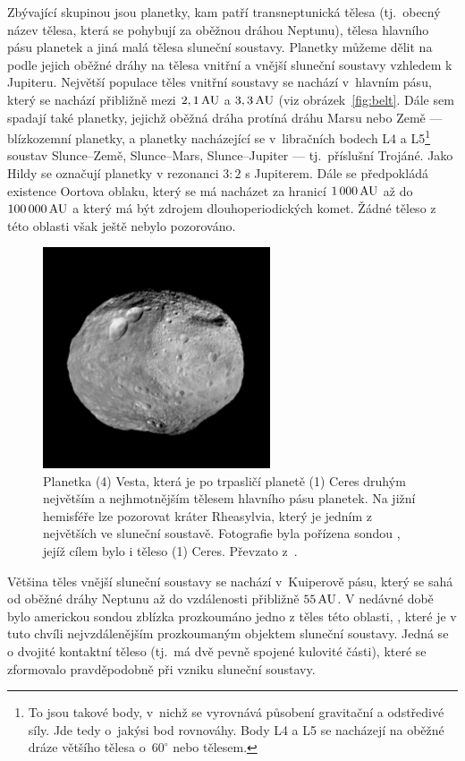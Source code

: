 \documentclass[A4paper, 12pt, oneside]{book}
\begin{document}
Zbývající skupinou jsou planetky, kam patří transneptunická tělesa (tj.\ obecný název tělesa, která se pohybují za oběžnou dráhou Neptunu), tělesa hlavního pásu planetek a jiná malá tělesa sluneční soustavy. Planetky můžeme dělit na podle jejich oběžné dráhy na tělesa vnitřní a vnější sluneční soustavy vzhledem k Jupiteru. Největší populace těles vnitřní soustavy se nachází v~hlavním pásu, který se nachází přibližně mezi $2,1\, {\rm AU}$ a $3,3\, {\rm AU}$ (viz obrázek~\ref{fig:belt}. Dále sem spadají také planetky, jejichž oběžná dráha protíná dráhu Marsu nebo Země --- blízkozemní planetky, a planetky nacházející se v~libračních bodech L4 a L5\footnote{To jsou takové body, v~nichž se vyrovnává působení gravitační a odstředivé síly. Jde tedy o~jakýsi bod rovnováhy. Body L4 a L5 se nacházejí na oběžné dráze většího tělesa o~$60^\circ$  nebo  tělesem.} soustav Slunce--Země, Slunce--Mars, Slunce--Jupiter --- tj.\ příslušní Trojáné. Jako Hildy se označují planetky v rezonanci $3:2$ s Jupiterem. Dále se předpokládá existence Oortova oblaku, který se má nacházet za hranicí $1\,000\,{\rm AU}$ až do $100\,000\,{\rm AU}$ a který má být zdrojem dlouhoperiodických komet. Žádné těleso z této oblasti však ještě nebylo pozorováno.

\begin{figure}
	\centering
	\includegraphics[width=0.6\textwidth]{obr/vesta.jpg}
	\caption{Planetka (4) Vesta, která je po trpasličí planetě (1) Ceres druhým největším a nejhmotnějším tělesem hlavního pásu planetek. Na jižní hemisféře lze pozorovat kráter Rheasylvia, který je jedním z největších ve sluneční soustavě. Fotografie byla pořízena sondou , jejíž cílem bylo i těleso (1) Ceres. Převzato z~\cite{jplvesta}.}
\end{figure}

Většina těles vnější sluneční soustavy se nachází v~Kuiperově pásu, který se sahá od oběžné dráhy Neptunu až do vzdálenosti přibližně $55\, {\rm AU}$. V nedávné době bylo americkou sondou  zblízka prozkoumáno jedno z těles této oblasti, , které je v tuto chvíli nejvzdálenějším prozkoumaným objektem sluneční soustavy. Jedná se o dvojité kontaktní těleso (tj.\ má dvě pevně spojené kulovité části), které se zformovalo pravděpodobně při vzniku sluneční soustavy.~\cite{ultimathule}
\end{document}
